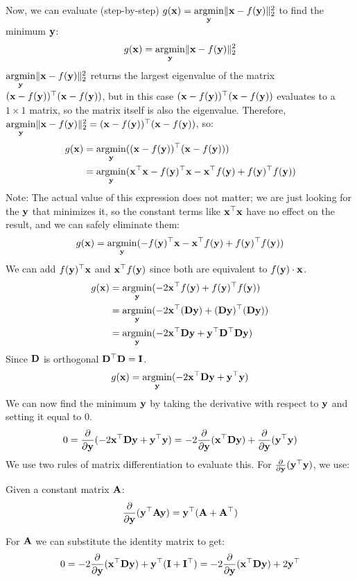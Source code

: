 Now, we can evaluate (step-by-step) $g(\vx) = \underset{\vy}{\argmin} \|\vx - f(\vy)\|^2_2$ to find the minimum $\vy$:
$$g(\vx) = \underset{\vy}{\argmin} \|\vx - f(\vy)\|^2_2$$
$\underset{\vy}{\argmin} \|\vx - f(\vy)\|^2_2$ returns the largest eigenvalue of the matrix $(\vx - f(\vy))^\top(\vx - f(\vy))$, but in this case $(\vx - f(\vy))^\top(\vx - f(\vy))$ evaluates to a $1 \times 1$ matrix, so the matrix itself is also the eigenvalue.  Therefore, $\underset{\vy}{\argmin} \|\vx - f(\vy)\|^2_2 = (\vx - f(\vy))^\top(\vx - f(\vy))$, so:
\begin{align*}
    g(\vx) &= \underset{\vy}{\argmin} ((\vx - f(\vy))^\top(\vx - f(\vy))) \\
&= \underset{\vy}{\argmin} (\vx^\top\vx - f(\vy)^\top\vx - \vx^\top f(\vy) + f(\vy)^\top f(\vy))
\end{align*}
Note: The actual value of this expression does not matter; we are just looking for the $\vy$ that minimizes it, so the constant terms like $\vx^\top\vx$ have no effect on the result, and we can safely eliminate them:
$$g(\vx) = \underset{\vy}{\argmin} (-f(\vy)^\top\vx - \vx^\top f(\vy) + f(\vy)^\top f(\vy))$$
We can add $f(\vy)^\top\vx$ and $\vx^\top f(\vy)$ since both are equivalent to $f(\vy) \cdot \vx$.
\begin{align*}
g(\vx) &= \underset{\vy}{\argmin} (-2\vx^\top f(\vy) + f(\vy)^\top f(\vy))\\
&= \underset{\vy}{\argmin} (-2\vx^\top(\MD\vy) + (\MD\vy)^\top(\MD\vy))\\
&= \underset{\vy}{\argmin} (-2\vx^\top\MD\vy + \vy^\top\MD^\top\MD\vy)
\end{align*}
Since $\MD$ is orthogonal $\MD^\top\MD = \MI$.
$$g(\vx) = \underset{\vy}{\argmin} (-2\vx^\top\MD\vy + \vy^\top\vy)$$
We can now find the minimum $\vy$ by taking the derivative with respect to $\vy$ and setting it equal to 0.
$$0 = \frac{\partial}{\partial\vy}(-2\vx^\top\MD\vy + \vy^\top\vy) = -2\frac{\partial}{\partial\vy}(\vx^\top\MD\vy) + \frac{\partial}{\partial\vy}(\vy^\top\vy)$$
We use two rules of matrix differentiation to evaluate this.  For $\frac{\partial}{\partial\vy}(\vy^\top\vy)$, we use:
\begin{theorem}
    Given a constant matrix $\MA$:
    $$\frac{\partial}{\partial\vy}(\vy^\top\MA\vy) = \vy^\top(\MA + \MA^\top)$$
\end{theorem}
For $\MA$ we can substitute the identity matrix to get:
$$0 = -2\frac{\partial}{\partial\vy}(\vx^\top\MD\vy) + \vy^\top(\MI + \MI^\top) = -2\frac{\partial}{\partial\vy}(\vx^\top\MD\vy) + 2\vy^\top$$
